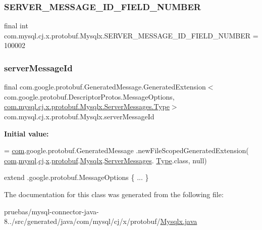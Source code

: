 \subsubsection{\texorpdfstring{S\+E\+R\+V\+E\+R\+\_\+\+M\+E\+S\+S\+A\+G\+E\+\_\+\+I\+D\+\_\+\+F\+I\+E\+L\+D\+\_\+\+N\+U\+M\+B\+ER}{SERVER\_MESSAGE\_ID\_FIELD\_NUMBER}}
{\footnotesize\ttfamily final int com.\+mysql.\+cj.\+x.\+protobuf.\+Mysqlx.\+S\+E\+R\+V\+E\+R\+\_\+\+M\+E\+S\+S\+A\+G\+E\+\_\+\+I\+D\+\_\+\+F\+I\+E\+L\+D\+\_\+\+N\+U\+M\+B\+ER = 100002\hspace{0.3cm}{\ttfamily [static]}}

\mbox{\label{classcom_1_1mysql_1_1cj_1_1x_1_1protobuf_1_1_mysqlx_aa80c35e06003c6b88c27f1dc6284db4b}} 
\subsubsection{\texorpdfstring{server\+Message\+Id}{serverMessageId}}
{\footnotesize\ttfamily final com.\+google.\+protobuf.\+Generated\+Message.\+Generated\+Extension$<$ com.\+google.\+protobuf.\+Descriptor\+Protos.\+Message\+Options, \mbox{\hyperlink{enumcom_1_1mysql_1_1cj_1_1x_1_1protobuf_1_1_mysqlx_1_1_server_messages_1_1_type}{com.\+mysql.\+cj.\+x.\+protobuf.\+Mysqlx.\+Server\+Messages.\+Type}}$>$ com.\+mysql.\+cj.\+x.\+protobuf.\+Mysqlx.\+server\+Message\+Id\hspace{0.3cm}{\ttfamily [static]}}

{\bfseries Initial value\+:}
\begin{DoxyCode}
= \mbox{\hyperlink{namespacecom}{com}}.google.protobuf.GeneratedMessage
          .newFileScopedGeneratedExtension(
        \mbox{\hyperlink{namespacecom}{com}}.\mbox{\hyperlink{namespacecom_1_1mysql}{mysql}}.\mbox{\hyperlink{namespacecom_1_1mysql_1_1cj}{cj}}.\mbox{\hyperlink{namespacecom_1_1mysql_1_1cj_1_1x}{x}}.\mbox{\hyperlink{namespacecom_1_1mysql_1_1cj_1_1x_1_1protobuf}{protobuf}}.\mbox{\hyperlink{classcom_1_1mysql_1_1cj_1_1x_1_1protobuf_1_1_mysqlx}{Mysqlx}}.\mbox{\hyperlink{classcom_1_1mysql_1_1cj_1_1x_1_1protobuf_1_1_mysqlx_1_1_server_messages}{ServerMessages}}.
      \mbox{\hyperlink{enumcom_1_1mysql_1_1cj_1_1x_1_1protobuf_1_1_mysqlx_1_1_server_messages_1_1_type}{Type}}.class,
        null)
\end{DoxyCode}
{\ttfamily extend .google.\+protobuf.\+Message\+Options \{ ... \}} 

The documentation for this class was generated from the following file\+:\begin{DoxyCompactItemize}
\item 
pruebas/mysql-\/connector-\/java-\/8../src/generated/java/com/mysql/cj/x/protobuf/\mbox{\hyperlink{_mysqlx_8java}{Mysqlx.\+java}}\end{DoxyCompactItemize}
